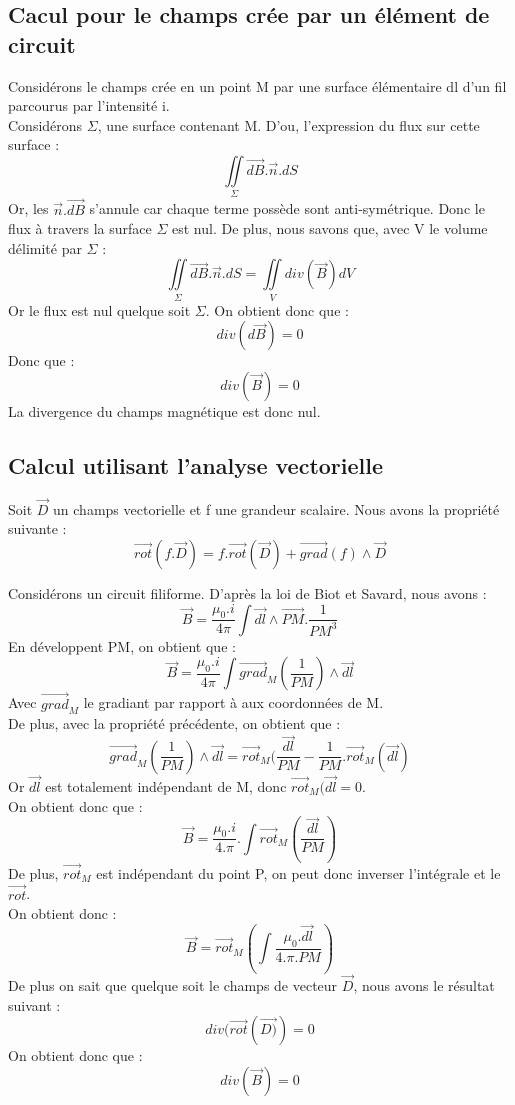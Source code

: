 \subsection{Cacul pour le champs crée par un élément de circuit}
\begin{prop}
Considérons le champs crée en un point M par une surface élémentaire dl d'un fil parcourus par l'intensité i.\\
Considérons $\Sigma$, une surface contenant M. D'ou, l'expression du flux sur cette surface : 
$$\underset{\Sigma}\iint \overrightarrow{dB}.\overrightarrow{n}.dS$$
Or, les $\overrightarrow{n}.\overrightarrow{dB}$ s'annule car chaque terme possède sont anti-symétrique. Donc le flux à travers la surface $\Sigma$ est nul. De plus, nous savons que, avec V le volume délimité par $\Sigma$ : 
$$\underset{\Sigma}\iint \overrightarrow{dB}.\overrightarrow{n}.dS = \underset{V}\iint div(\overrightarrow{B})dV$$
Or le flux est nul quelque soit $\Sigma$. On obtient donc que :
$$div(d\overrightarrow{B}) = 0$$
Donc que : 
$$div(\overrightarrow{B}) = 0$$
La divergence du champs magnétique est donc nul.
\end{prop}
\subsection{Calcul utilisant l'analyse vectorielle}
\begin{prop}
Soit $\overrightarrow{D}$ un champs vectorielle et f une grandeur scalaire. Nous avons la propriété suivante : 
$$\overrightarrow{rot}(f.\overrightarrow{D}) = f.\overrightarrow{rot}(\overrightarrow{D})+\overrightarrow{grad}(f)\wedge\overrightarrow{D}$$
\end{prop}
\begin{prop}
Considérons un circuit filiforme. D'après la loi de Biot et Savard, nous avons : 
$$\overrightarrow{B} = \dfrac{\mu_0.i}{4\pi}\int \overrightarrow{dl}\wedge\overrightarrow{PM}.\dfrac{1}{PM^3}$$
En développent PM, on obtient que :
$$\overrightarrow{B} = \dfrac{\mu_0.i}{4\pi}\int \overrightarrow{grad}_M(\dfrac{1}{PM})\wedge\overrightarrow{dl}$$
Avec $\overrightarrow{grad}_M$ le gradiant par rapport à aux coordonnées de M.\\
De plus, avec la propriété précédente, on obtient que :
$$\overrightarrow{grad}_M(\dfrac{1}{PM})\wedge\overrightarrow{dl} = \overrightarrow{rot}_M(\dfrac{\overrightarrow{dl}}{PM}-\dfrac{1}{PM}.\overrightarrow{rot}_M(\overrightarrow{dl})$$
Or $\overrightarrow{dl}$ est totalement indépendant de M, donc $\overrightarrow{rot}_M(\overrightarrow{dl} = 0$.\\
On obtient donc que :
$$\overrightarrow{B}=\dfrac{\mu_0.i}{4.\pi}.\int \overrightarrow{rot}_M(\dfrac{\overrightarrow{dl}}{PM})$$
De plus, $\overrightarrow{rot}_M$ est indépendant du point P, on peut donc inverser l'intégrale et le $\overrightarrow{rot}$.\\
On obtient donc : 
$$\overrightarrow{B}=\overrightarrow{rot}_M\left(\int \dfrac{\mu_0.\overrightarrow{dl}}{4.\pi.PM}\right)$$
De plus on sait que quelque soit le champs de vecteur $\overrightarrow{D}$, nous avons le résultat suivant :
$$div(\overrightarrow{rot}(\overrightarrow{D)})=0$$
On obtient donc que :
$$div(\overrightarrow{B})=0$$
\end{prop}
